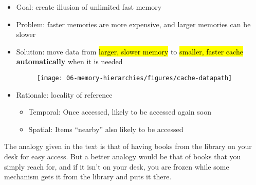 \setlength{\columnseprule}{1pt}
\def\columnseprulecolor{\color{blue}}


\begin{frame}[fragile]
\begin{itemize}
\item Goal: create illusion of unlimited fast memory
\item Problem: faster memories are more expensive, and larger memories
can be slower
\item Solution: move data from \hl{larger, slower memory} to \hl{smaller, faster cache} \textbf{automatically} when it is needed
\begin{figure}[H]
\centering
	{\texttt{[image: 06-memory-hierarchies/figures/cache-datapath]}}
\end{figure}

\item Rationale: locality of reference
\begin{itemize}
\item Temporal: Once accessed, likely to be accessed again soon
\item Spatial: Items ``nearby'' also likely to be accessed
\end{itemize}
\end{itemize}
\BNotes\ifnum{}
The analogy given in the text is that of having books from the library
on your desk for easy access. But a better analogy would be that of
books that you simply reach for, and if it isn't on your desk, you are
frozen while some mechanism gets it from the library and puts it there.
\fi\ENotes
\end{frame}

